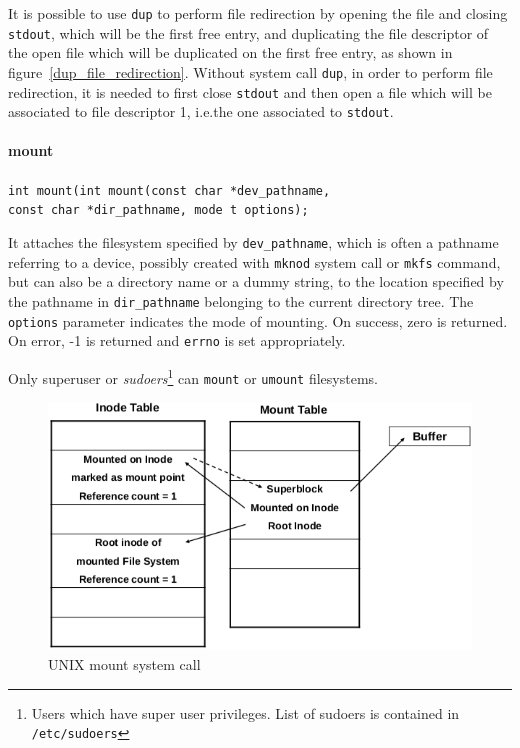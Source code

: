 It is possible to use \texttt{dup} to perform file redirection by opening the file and closing \texttt{stdout}, which will be the first free entry, and duplicating the file descriptor of the open file which will be duplicated on the first free entry, as shown in figure~\ref{dup_file_redirection}. Without system call \texttt{dup}, in order to perform file redirection, it is needed to first close \texttt{stdout} and then open a file which will be associated to file descriptor 1, i.e.\@ the one associated to \texttt{stdout}.

\paragraph{mount}
\texttt{int mount(int mount(const char *dev\_pathname, \\ const char *dir\_pathname, mode t options);}

It attaches the filesystem specified by \texttt{dev\_pathname}, which is often a pathname referring to a device, possibly created with \texttt{mknod} system call or \texttt{mkfs} command, but can also be a directory name or a dummy string, to the location specified by the pathname in \texttt{dir\_pathname} belonging to the current directory tree. The \texttt{options} parameter indicates the mode of mounting. On success, zero is
returned. On error, -1 is returned and
\texttt{errno} is set appropriately.

Only superuser or \emph{sudoers}\footnote{Users which have super user privileges. List of sudoers is contained in \texttt{/etc/sudoers}} can \texttt{mount} or \texttt{umount} filesystems.

\begin{figure}[hbtp]
\centering
\includegraphics[scale=0.35]{images/file_system/mount.png}
\caption{UNIX mount system call}
\end{figure}

